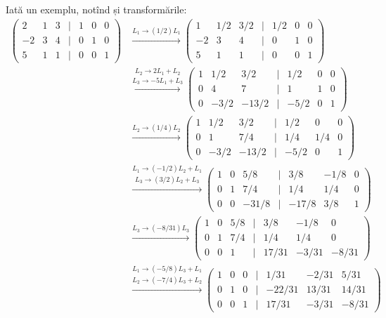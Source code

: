 Iată un exemplu, notînd și transformările:
\begin{align*}
    \begin{pmatrix}
        2 & 1 & 3 & \mid & 1 & 0 & 0 \\
        -2 & 3 & 4 & \mid & 0 & 1 & 0 \\
        5 & 1 & 1 & \mid & 0 & 0 & 1
    \end{pmatrix} &\xrightarrow{L_1 \to (1/2)L_1}
    \begin{pmatrix}
        1 & 1/2 & 3/2 & \mid & 1/2 & 0 & 0 \\
        -2 & 3 & 4 & \mid & 0 & 1 & 0 \\
        5 & 1 & 1 & \mid & 0 & 0 & 1 
    \end{pmatrix} \\
                  &\stackrel{L_2 \to 2L_1 + L_2}{\xrightarrow{L_3 \to -5L_1 + L_3}}
                  \begin{pmatrix}
                      1 & 1/2 & 3/2 & \mid & 1/2 & 0 & 0 \\
                      0 & 4 & 7 & \mid & 1 & 1 & 0 \\
                      0 & -3/2 & -13/2 & \mid & -5/2 & 0 & 1
                  \end{pmatrix} \\
  &\xrightarrow{L_2 \to (1/4)L_2}
  \begin{pmatrix}
      1 & 1/2 & 3/2 & \mid & 1/2 & 0 & 0 \\
      0 & 1 & 7/4 & \mid & 1/4 & 1/4 & 0 \\
      0 & -3/2 & -13/2 & \mid & -5/2 & 0 & 1 
  \end{pmatrix} \\
  &\stackrel{L_1 \to (-1/2)L_2 + L_1}{\xrightarrow{L_3 \to (3/2)L_2 + L_3}}
  \begin{pmatrix}
      1 & 0 & 5/8 & \mid & 3/8 & -1/8 & 0 \\
      0 & 1 & 7/4 & \mid & 1/4 & 1/4 & 0 \\
      0 & 0 & -31/8 & \mid & -17/8 & 3/8 & 1
  \end{pmatrix} \\
  &\xrightarrow{L_3 \to (-8/31)L_3}
  \begin{pmatrix}
      1 & 0 & 5/8 & \mid & 3/8 & -1/8 & 0 \\
      0 & 1 & 7/4 & \mid & 1/4 & 1/4 & 0 \\
      0 & 0 & 1 & \mid & 17/31 & -3/31 & -8/31
  \end{pmatrix} \\
  &\stackrel{L_1 \to (-5/8)L_3 + L_1}{\xrightarrow{L_2 \to (-7/4)L_3 + L_2}}
  \begin{pmatrix}
      1 & 0 & 0 & \mid & 1/31 & -2/31 & 5/31 \\
      0 & 1 & 0 & \mid & -22/31 & 13/31 & 14/31 \\
      0 & 0 & 1 & \mid & 17/31 & -3/31 & -8/31
  \end{pmatrix}
\end{align*}

